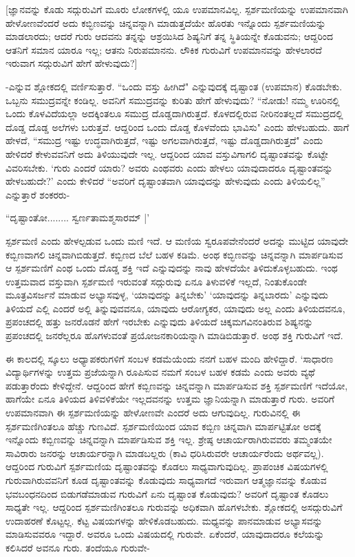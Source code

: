 [ಜ್ಞಾನವನ್ನು ಕೊಡು ಸದ್ಗುರುವಿಗೆ ಮೂರು ಲೋಕಗಳಲ್ಲಿ ಯೂ ಉಪಮಾನವಿಲ್ಲ. ಸ್ಪರ್ಶಮಣಿಯನ್ನು ಉಪಮಾನವಾಗಿ ಹೇಳೋಣವೆಂದರೆ ಅದು ಕಬ್ಭಿಣವನ್ನು ಚಿನ್ನವನ್ನಾಗಿ ಮಾಡುತ್ತದೆಯೇ ಹೊರತು ಇನ್ನೊಂದು ಸ್ಪರ್ಶಮಣಿಯನ್ನು ಮಾಡಲಾರದು; ಆದರೆ ಗುರು ಆದವನು ತನ್ನನ್ನು ಆಶ್ರಯಿಸಿದ ಶಿಷ್ಯನಿಗೆ ತನ್ನ ಸ್ಥಿತಿಯನ್ನೇ ಕೊಡುವನು; ಆದ್ದರಿಂದ ಆತನಿಗೆ ಸಮಾನ ಯಾರೂ ಇಲ್ಲ; ಆತನು ನಿರುಪಮಾನನು. ಲೌಕಿಕ ಗುರುವಿಗೆ ಉಪಮಾನವನ್ನು ಹೇಳಲಾರದೆ ಇರುವಾಗ ಸದ್ಗುರುವಿಗೆ ಹೇಗೆ ಹೇಳುವುದು?]

-ಎನ್ನುವ ಶ್ಲೋಕದಲ್ಲಿ ವರ್ಣಿಸುತ್ತಾರೆ. ``ಒಂದು ವಸ್ತು ಹೀಗಿದೆ" ಎನ್ನುವುದಕ್ಕೆ ದೃಷ್ಟಾಂತ (ಉಪಮಾನ) ಕೊಡಬೇಕು. ಒಬ್ಬನು ಸಮುದ್ರವನ್ನೇ ಕಂಡಿಲ್ಲ. ಅವನಿಗೆ ಸಮುದ್ರವನ್ನು ಕುರಿತು ಹೇಗೆ ಹೇಳುವುದು? ``ನೋಡು! ನಮ್ಮ ಊರಿನಲ್ಲಿ ಒಂದು ಕೊಳವಿದೆಯಲ್ಲಾ ಅದಕ್ಕಿಂತಲೂ ಸಮುದ್ರ ದೊಡ್ಡದಾಗಿರುತ್ತದೆ. ಕೊಳದಲ್ಲಿರುವ ನೀರಿನಂತಲ್ಲದೆ ಸಮುದ್ರದಲ್ಲಿ ದೊಡ್ಡ ದೊಡ್ಡ ಅಲೆಗಳು ಬರುತ್ತವೆ. ಆದ್ದರಿಂದ ಒಂದು ದೊಡ್ಡ ಕೊಳವೆಂದು ಭಾವಿಸು" ಎಂದು ಹೇಳಬಹುದು. ಹಾಗೆ ಹೇಳದೆ, ``ಸಮುದ್ರ ಇಷ್ಟು ಉದ್ಧವಾಗಿರುತ್ತದೆ, ಇಷ್ಟು ಅಗಲವಾಗಿರುತ್ತದೆ, ಇಷ್ಟು ದೊಡ್ಡದಾಗಿರುತ್ತದೆ" ಎಂದು ಹೇಳಿದರೆ ಕೇಳುವವನಿಗೆ ಅದು ತಿಳಿಯುವುದೇ ಇಲ್ಲ. ಆದ್ದರಿಂದ ಯಾವ ವಸ್ತುವಿಗಾಗಲಿ ದೃಷ್ಟಾಂತವನ್ನು ಕೊಟ್ಟೇ ವಿವರಿಸಬೇಕು. `ಗುರು ಎಂದರೆ ಯಾರು? ಅವರು ಎಂಥವರು ಎಂದು ಹೇಳಲು ಯಾವುದಾದರೂ ದೃಷ್ಟಾಂತವನ್ನು ಹೇಳಬಹುದೇ?' ಎಂದು ಕೇಳಿದರೆ ``ಅವರಿಗೆ ದೃಷ್ಟಾಂತವಾಗಿ ಯಾವುದನ್ನು ಹೇಳುವುದು ಎಂದು ತಿಳಿಯಲಿಲ್ಲ'' ಎನ್ನುತ್ತಾರೆ ಶಂಕರರು-

\begin{shloka}
``ದೃಷ್ಟಾಂತೋ........ ಸ್ವರ್ಣತಾಮಶ್ಮಸಾರಮ್ |'
\end{shloka}

ಸ್ಪರ್ಶಮಣಿ ಎಂದು ಹೇಳಲ್ಪಡುವ ಒಂದು ಮಣಿ ಇದೆ. ಆ ಮಣಿಯ ಸ್ವರೂಪವೇನೆಂದರೆ ಅದನ್ನು ಮುಟ್ಟಿದ ಯಾವುದೇ ಕಬ್ಬಿಣವಾಗಲಿ ಚಿನ್ನವಾಗಿಬಿಡುತ್ತದೆ. ಕಬ್ಬಿಣದ ಬೆಲೆ ಬಹಳ ಕಡಿಮೆ. ಅಂಥ ಕಬ್ಭಿಣವನ್ನು ಚಿನ್ನವನ್ನಾಗಿ ಮಾರ್ಪಡಿಸುವ ಆ ಸ್ಪರ್ಶಮಣಿಗೆ ಎಂಥ ಒಂದು ದೊಡ್ಡ ಶಕ್ತಿ ಇದೆ ಎನ್ನುವುದನ್ನು ನಾವು ಹೇಳದೆಯೇ ತಿಳಿದುಕೊಳ್ಳಬಹುದು. ಇಂಥ ಉತ್ತಮವಾದ ವಸ್ತುವಾಗಿ ಸ್ಪರ್ಶಮಣಿ ಇರುವಂತೆ ಸದ್ಗುರುವು ಏನೂ ತಿಳುವಳಿಕೆ ಇಲ್ಲದೆ, ನಿಂತುಕೊಂಡೇ ಮೂತ್ರವಿಸರ್ಜನೆ ಮಾಡುವ ಅಭ್ಯಾಸವುಳ್ಳ, `ಯಾವುದನ್ನು ತಿನ್ನಬೇಕು' `ಯಾವುದನ್ನು ತಿನ್ನಬಾರದು' ಎನ್ನುವುದು ತಿಳಿಯದೆ ಎಲ್ಲಿ ಎಂದರೆ ಅಲ್ಲಿ ತಿನ್ನುವುವವನೂ, ಯಾವುದು ಆರೋಗ್ಯಕರ, ಯಾವುದು ಅಲ್ಲ ಎಂದು ತಿಳಿಯದವನೂ, ಪ್ರಪಂಚದಲ್ಲಿ ಹತ್ತು ಜನರೊಡನೆ ಹೇಗೆ ಇರಬೇಕು ಎನ್ನುವುದು ತಿಳಿಯದೆ ಚಿಕ್ಕಮಗವಿನಂತಿರುವ ಶಿಷ್ಯನನ್ನು ಪ್ರಪಂಚದಲ್ಲಿ ಜನರೆಲ್ಲರೂ ಹೊಗಳುವಂತೆ ಪ್ರಯೋಜನಕಾರಿಯನ್ನಾಗಿ ಮಾಡಿಬಿಡುತ್ತಾರೆ. ಅಂಥ ಶಕ್ತಿ ಗುರುವಿಗೆ ಇದೆ.

ಈ ಕಾಲದಲ್ಲಿ ಸ್ಕೂಲು ಅಧ್ಯಾಪಕರುಗಳಿಗೆ ಸಂಬಳ ಕಡಮೆಯೆಂದು ನನಗೆ ಬಹಳ ಮಂದಿ ಹೇಳಿದ್ದಾರೆ. `ಸಾಧಾರಣ ವಿದ್ಯಾರ್ಥಿಗಳನ್ನು ಉತ್ತಮ ಪ್ರಜೆಯನ್ನಾಗಿ ರೂಪಿಸುವ ನಮಗೆ ಸಂಬಳ ಬಹಳ ಕಡಮೆ ಎಂದು ಅವರು ವ್ಯಥೆ ಪಡುತ್ತಾರೆಂದು ಕೇಳಿದ್ದೇನೆ. ಆದ್ದರಿಂದ ಹೇಗೆ ಕಬ್ಬಿಣವನ್ನು ಚಿನ್ನವನ್ನಾಗಿ ಮಾರ್ಪಡಿಸುವ ಶಕ್ತಿ ಸ್ಪರ್ಶಮಣಿಗೆ ಇದೆಯೋ, ಹಾಗೆಯೇ ಏನೂ ತಿಳಿಯದ ತಿಳಿವಳಿಕೆಯೇ ಇಲ್ಲದವನನ್ನು ಉತ್ತಮ ಜ್ಞಾನಿಯನ್ನಾಗಿ ಮಾಡುತ್ತಾರೆ ಗುರು. ಅವರಿಗೆ ಉಪಮಾನವಾಗಿ ಈ ಸ್ಪರ್ಶಮಣಿಯನ್ನು  ಹೇಳೋಣವೇ ಎಂದರೆ ಅದು ಆಗುವುದಿಲ್ಲ. ಗುರುವಿನಲ್ಲಿ ಈ ಸ್ಪರ್ಶಮಣಿಗಿಂತಲೂ ಹೆಚ್ಚು ಗುಣವಿದೆ. ಸ್ಪರ್ಶಮಣಿಯಿಂದ ಯಾವ ಕಬ್ಬಿಣ ಚಿನ್ನವಾಗಿ ಮಾರ್ಪಟ್ಟಿತೋ ಅದಕ್ಕೆ ಇನ್ನೊಂದು ಕಬ್ಬಿಣವನ್ನು ಚಿನ್ನವನ್ನಾಗಿ ಮಾರ್ಪಡಿಸುವ ಶಕ್ತಿ ಇಲ್ಲ. ಶ್ರೇಷ್ಠ ಆಚಾರ್ಯರಾಗಿರುವವರು ತಮ್ಮಂತಯೇ ಸಾವಿರಾರು ಜನರನ್ನು ಆಚಾರ್ಯರನ್ನಾಗಿ ಮಾಡಬಲ್ಲರು (ಕಾವಿ ಧರಿಸಿರುವರೇ ಆಚಾರ್ಯರೆಂದು ಅರ್ಥವಲ್ಲ). ಆದ್ದರಿಂದ ಗುರುವಿಗೆ ಸ್ಪರ್ಶಮಣಿಯ ದೃಷ್ಟಾಂತವನ್ನು ಕೊಡಲು ಸಾಧ್ಯವಾಗುವುದಿಲ್ಲ. ಪ್ರಾಪಂಚಿಕ ವಿಷಯಗಳಲ್ಲಿ ಗುರುವಾಗಿರುವವನಿಗೆ ಕೂಡ ದೃಷ್ಟಾಂತವನ್ನು ಕೊಡುವುದು ಸಾಧ್ಯವಾಗದೆ ಇರುವಾಗ ಆತ್ಮಜ್ಞಾನವನ್ನು ಕೊಡುವ ಭವಬಂಧನದಿಂದ ಬಿಡುಗಡೆಮಾಡುವ ಗುರುವಿಗೆ ಏನು ದೃಷ್ಟಾಂತ ಕೊಡುವುದು? ಅವರಿಗೆ ದೃಷ್ಟಾಂತ ಕೊಡಲು ಸಾಧ್ಯತೇ ಇಲ್ಲ. ಆದ್ದರಿಂದ ಸ್ಪರ್ಶಮಣಿಗಿಂತಲೂ ಗುರುವನ್ನು ಅಧಿಕವಾಗಿ  ಹೊಗಳಬೇಕು. ಶ್ಲೋಕದಲ್ಲಿ ಅಸದ್ಗುರುವಿಗೆ ಉದಾಹರಣೆ ಕೊಟ್ಟಲ್ಲ. ಕೆಟ್ಟ ವಿಷಯಗಳನ್ನು ಹೇಳಿಕೊಡಬಹುದು. ಮಧ್ಯವನ್ನು ಪಾನಮಾಡುವ ಅಭ್ಯಾಸವನ್ನು ಮಾಡಿಸುವವರೂ ಇದ್ದಾರೆ. ಅವರೂ ಒಂದು ವಿಷಯದಲ್ಲಿ ಗುರುವೇ. ಏಕೆಂದರೆ, ಯಾವುದಾದರೂ ಕಲೆಯನ್ನು ಕಲಿಸಿದರೆ ಅವನೂ ಗುರು. ತಂದೆಯೂ ಗುರುವೇ-

